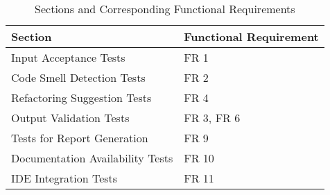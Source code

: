 \documentclass[12pt, titlepage]{article}
\begin{document}
\begin{table}[ht]
  \centering
  \caption{Sections and Corresponding Functional Requirements}
  \begin{tabular}{|p{}|p{}|}
  \hline
  \textbf{Section} & \textbf{Functional Requirement} \\ \hline
  
  Input Acceptance Tests & FR 1 \\ \hline
  Code Smell Detection Tests & FR 2 \\ \hline
  Refactoring Suggestion Tests & FR 4 \\ \hline
  Output Validation Tests & FR 3, FR 6 \\ \hline
  Tests for Report Generation & FR 9 \\ \hline
  Documentation Availability Tests & FR 10 \\ \hline
  IDE Integration Tests & FR 11 \\ \hline
  
  \end{tabular}
  \label{tab:sections_requirements}
  \end{table}
  
  
			



\newpage
\end{document}
